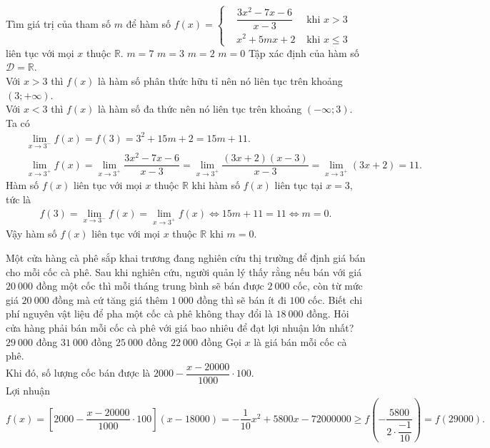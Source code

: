 \begin{ex}%
 Tìm giá trị của tham số $m$ để hàm số $f(x)=\left\{\begin{aligned}&\dfrac{3x^2-7x-6}{x-3} & \text{ khi } x>3 \\&x^2+5mx+2 & \text{ khi } x\leq 3\end{aligned}\right.$ liên tục với mọi $x$ thuộc $\mathbb{R}$.
 \choice
  {$m=7$}
  {$m=3$}
  {$m=2$}
  {\True $m=0$}
 \loigiai
  {
  Tập xác định của hàm số $\mathscr{D}=\mathbb{R}$.\\
  Với $x>3$ thì $f(x)$ là hàm số phân thức hữu tỉ nên nó liên tục trên khoảng $(3;+\infty)$.\\
  Với $x<3$ thì $f(x)$ là hàm số đa thức nên nó liên tục trên khoảng $(-\infty;3)$.\\
  Ta có
  \begin{eqnarray*}
   && \lim\limits_{x\to 3^-}f(x)=f(3)=3^2+15m+2=15m+11.\\
   && \lim\limits_{x\to 3^+}f(x)=\lim\limits_{x\to 3^+}\dfrac{3x^2-7x-6}{x-3}=\lim\limits_{x\to 3^+}\dfrac{(3x+2)(x-3)}{x-3}=\lim\limits_{x\to 3^+}(3x+2)=11.
  \end{eqnarray*}
  Hàm số $f(x)$ liên tục với mọi $x$ thuộc $\mathbb{R}$ khi hàm số $f(x)$ liên tục tại $x=3$, tức là
  \begin{eqnarray*}
   f(3)=\lim\limits_{x\to 3^-}f(x)=\lim\limits_{x\to 3^+}f(x) \Leftrightarrow 15m+11=11 \Leftrightarrow m=0.
  \end{eqnarray*}
  Vậy hàm số $f(x)$ liên tục với mọi $x$ thuộc $\mathbb{R}$ khi $m=0$.
  }
\end{ex}

\begin{ex}%
 Một cửa hàng cà phê sắp khai trương đang nghiên cứu thị trường để định giá bán cho mỗi cốc cà phê. Sau khi nghiên cứu, người quản lý thấy rằng nếu bán với giá $20\ 000$ đồng một cốc thì mỗi tháng trung bình sẽ bán được $2\ 000$ cốc, còn từ mức giá $20\ 000$ đồng mà cứ tăng giá thêm $1\ 000$ đồng thì sẽ bán ít đi $100$ cốc. Biết chi phí nguyên vật liệu để pha một cốc cà phê không thay đổi là $18\ 000$ đồng. Hỏi cửa hàng phải bán mỗi cốc cà phê với giá bao nhiêu để đạt lợi nhuận lớn nhất?
 \choice
  {\True $29\ 000$ đồng}
  {$31\ 000$ đồng}
  {$25\ 000$ đồng}
  {$22\ 000$ đồng}
 \loigiai
  {
  Gọi $x$ là giá bán mỗi cốc cà phê.\\
  Khi đó, số lượng cốc bán được là $2000-\dfrac{x-20000}{1000}\cdot 100.$\\
  Lợi nhuận $$f(x)=\left[2000-\dfrac{x-20000}{1000}\cdot 100 \right]\left(x-18000\right)=-\dfrac{1}{10}x^2+5800x-72000000\ge f\left(-\dfrac{5800}{2\cdot \dfrac{-1}{10}}   \right)=f(29000).$$
  }
\end{ex}

